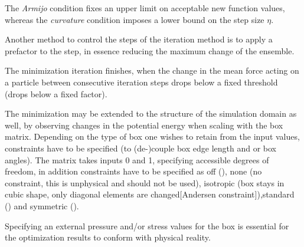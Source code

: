The \emph{Armijo} condition fixes an upper limit on acceptable new function values, whereas the \emph{curvature} condition imposes a lower bound on the step size $\eta$.


Another method to control the steps of the iteration method is to apply a prefactor to the step, in essence reducing the maximum change of the ensemble.

The minimization iteration finishes, when the change in the mean force acting on a particle between consecutive iteration steps drops below a fixed threshold (drops below a fixed factor).

\bigbreak
The minimization may be extended to the structure of the simulation domain as well, by observing changes in the potential energy when scaling with the box matrix.
Depending on the type of box one wishes to retain from the input values, constraints have to be specified (to (de-)couple box edge length and or box angles).
The matrix takes inputs 0 and 1, specifying accessible degrees of freedom, in addition constraints have to be specified as off (), 
none (no constraint, this is unphysical and should not be used), isotropic (box stays in cubic shape, only diagonal elements are changed[Andersen constraint]),standard () and symmetric ().


Specifying an external pressure and/or stress values for the box is essential for the optimization results to conform with physical reality.


